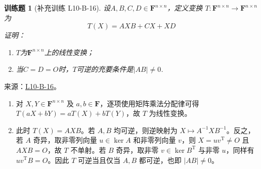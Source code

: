 \documentclass[UTF8,12pt,a4paper,fontset=fandol]{ctexart}
\newtheorem{exercise}{训练题}[section]
\begin{document}
\begin{exercise}[补充训练 L10-B-16]\label{prob:L10-B-16}
设$A,B,C,D \in \mathbf{F}^{n \times n}$，定义变换 $ T : \mathbf{F}^{n \times n} \to \mathbf{F}^{n \times n}$ 为
        \[ T(X) = AXB+CX+XD \]
        证明：
        \begin{enumerate}
            \item $T$为$\mathbf{F}^{n \times n}$上的线性变换；

            \item 当$C=D=O$时，$T$可逆的充要条件是$|AB| \neq 0$.
        \end{enumerate}
\end{exercise}
\noindent 来源：\href{https://github.com/yhwu-is/Linear-Algebra-Left-Undone/blob/new/%E8%AE%B2%E4%B9%89/%E4%B8%93%E9%A2%98/10%20%E8%A1%8C%E5%88%97%E5%BC%8F.tex}{L10-B-16}。
\begin{solve}
\begin{enumerate}
\item 对 $X,Y\in\mathbf F^{n\times n}$ 及 $a,b\in\mathbf F$，逐项使用矩阵乘法分配律可得 $T(aX+bY)=aT(X)+bT(Y)$，故 $T$ 为线性变换。
\item 此时 $T(X)=AXB$。若 $A,B$ 均可逆，则逆映射为 $X\mapsto A^{-1}XB^{-1}$。反之，若 $A$ 奇异，取非零列向量 $u\in\ker A$ 和非零列向量 $v$，则 $X=uv^{\mathrm T}\ne O$ 且 $AXB=O$，故 $T$ 不单射。若 $B$ 奇异，取非零 $v\in\ker B^{\mathrm T}$ 与非零 $u$，同样有 $uv^{\mathrm T}B=O$。因此 $T$ 可逆当且仅当 $A,B$ 都可逆，也即 $|AB|\ne0$。\end{enumerate}
\end{solve}
\end{document}
